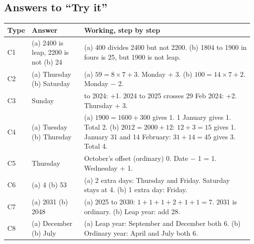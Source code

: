 \documentclass[11pt,a4paper]{article}
\let\oldsubsection\subsection
\renewcommand{\subsection}{\needspace{9\baselineskip}\oldsubsection}
\begin{document}
\subsection*{Answers to ``Try it''}
\begin{center}\small\renewcommand{\arraystretch}{1.25}\setlength{\tabcolsep}{8pt}
\begin{tabularx}{\linewidth}{@{}l>{\raggedright\arraybackslash}p{3.4cm}>{\raggedright\arraybackslash}X@{}}
\toprule
\textbf{\color{slate}Type} & \textbf{\color{slate}Answer} & \textbf{\color{slate}Working, step by step} \\ \midrule
C1 & (a) 2400 is leap, 2200 is not \newline (b) 24 & (a) 400 divides 2400 but not 2200. \newline (b) 1804 to 1900 in fours is 25, but 1900 is not leap. \\
C2 & (a) Thursday \newline (b) Saturday & (a) $59 = 8 \times 7 + 3$. Monday + 3. \newline (b) $100 = 14 \times 7 + 2$. Monday $-$ 2. \\
C3 & Sunday & 2023 to 2024: +1. 2024 to 2025 crosses 29 Feb 2024: +2. \newline Thursday + 3. \\
C4 & (a) Tuesday \newline (b) Thursday & (a) $1900 = 1600 + 300$ gives 1. 1 January gives 1. Total 2. \newline (b) $2012 = 2000 + 12$: $12 + 3 = 15$ gives 1. January 31 and 14 February: $31 + 14 = 45$ gives 3. Total 4. \\
C5 & Thursday & October's offset (ordinary) 0. Date $-$ 1 = 1. \newline Wednesday + 1. \\
C6 & (a) 4 \newline (b) 53 & (a) 2 extra days: Thursday and Friday. Saturday stays at 4. \newline (b) 1 extra day: Friday. \\
C7 & (a) 2031 \newline (b) 2048 & (a) 2025 to 2030: $1 + 1 + 1 + 2 + 1 + 1 = 7$. 2031 is ordinary. \newline (b) Leap year: add 28. \\
C8 & (a) December \newline (b) July & (a) Leap year: September and December both 6. \newline (b) Ordinary year: April and July both 6. \\

\end{tabularx}
\end{center}
\end{document}
